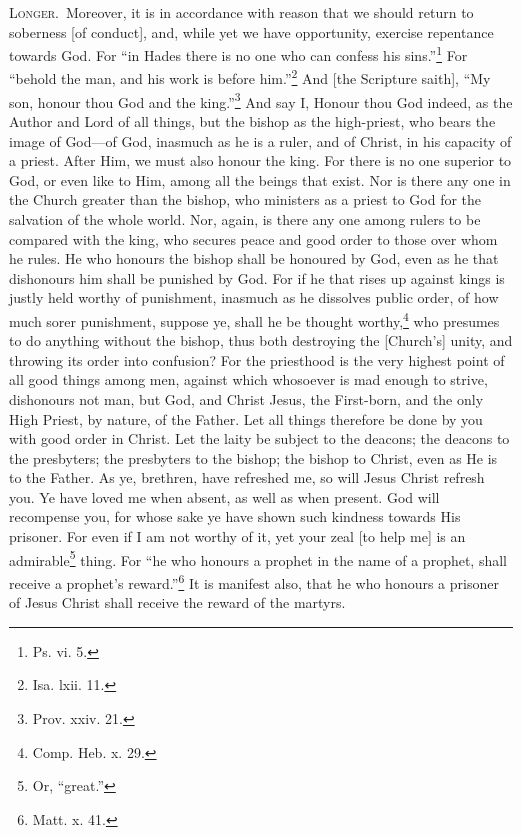 \textsc{Longer.}~Moreover, it is in accordance with reason that we should return to soberness [of conduct], and, while yet we have opportunity, exercise repentance towards God. For “in Hades there is no one who can confess his sins.”\footnote{Ps. vi. 5.} For “behold the man, and his work is before him.”\footnote{Isa. lxii. 11.} And [the Scripture saith], “My son, honour thou God and the king.”\footnote{Prov. xxiv. 21.} And say I, Honour thou God indeed, as the Author and Lord of all things, but the bishop as the high-priest, who bears the image of God—of God, inasmuch as he is a ruler, and of Christ, in his capacity of a priest. After Him, we must also honour the king. For there is no one superior to God, or even like to Him, among all the beings that exist. Nor is there any one in the Church greater than the bishop, who ministers as a priest to God for the salvation of the whole world. Nor, again, is there any one among rulers to be compared with the king, who secures peace and good order to those over whom he rules. He who honours the bishop shall be honoured by God, even as he that dishonours him shall be punished by God. For if he that rises up against kings is justly held worthy of punishment, inasmuch as he dissolves public order, of how much sorer punishment, suppose ye, shall he be thought worthy,\footnote{Comp. Heb. x. 29.} who presumes to do anything without the bishop, thus both destroying the [Church’s] unity, and throwing its order into confusion? For the priesthood is the very highest point of all good things among men, against which whosoever is mad enough to strive, dishonours not man, but God, and Christ Jesus, the First-born, and the only High Priest, by nature, of the Father. Let all things therefore be done by you with good order in Christ. Let the laity be subject to the deacons; the deacons to the presbyters; the presbyters to the bishop; the bishop to Christ, even as He is to the Father. As ye, brethren, have refreshed me, so will Jesus Christ refresh you. Ye have loved me when absent, as well as when present. God will recompense you, for whose sake ye have shown such kindness towards His prisoner. For even if I am not worthy of it, yet your zeal [to help me] is an admirable\footnote{Or, “great.”} thing. For “he who honours a prophet in the name of a prophet, shall receive a prophet’s reward.”\footnote{Matt. x. 41.} It is manifest also, that he who honours a prisoner of Jesus Christ shall receive the reward of the martyrs.


